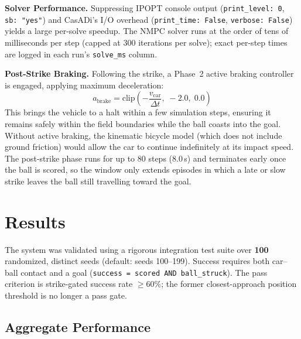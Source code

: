 \documentclass[10pt,twocolumn,letterpaper]{article}
\begin{document}
\textbf{Solver Performance.} Suppressing IPOPT console output
(\texttt{print\_level:\,0}, \texttt{sb:\,"yes"}) and CasADi's I/O
overhead (\texttt{print\_time:\,False}, \texttt{verbose:\,False})
yields a large per-solve speedup. The NMPC solver runs at the order of
tens of milliseconds per step (capped at 300 iterations per solve);
exact per-step times are logged in each run's \texttt{solve\_ms} column.

\textbf{Post-Strike Braking.} Following the strike, a Phase~2 active
braking controller is engaged, applying maximum deceleration:
\begin{equation}
  a_{\text{brake}} = \text{clip}\!\left(
    -\frac{v_{\text{car}}}{\Delta t},\; -2.0,\; 0.0\right)
  \label{eq:brake}
\end{equation}
This brings the vehicle to a halt within a few simulation steps,
ensuring it remains safely within the field boundaries while the ball
coasts into the goal. Without active braking, the kinematic bicycle
model (which does not include ground friction) would allow the car to
continue indefinitely at its impact speed. The post-strike phase runs
for up to 80 steps (8.0\,s) and terminates early once the ball is
scored, so the window only extends episodes in which a late or slow
strike leaves the ball still travelling toward the goal.

\section{Results}

The system was validated using a rigorous integration test suite over
\textbf{100} randomized, distinct seeds (default: seeds 100--199).
Success requires both car--ball contact and a goal
(\texttt{success = scored AND ball\_struck}). The pass criterion is
strike-gated success rate $\geq 60\%$; the former closest-approach
position threshold is no longer a pass gate.

\subsection{Aggregate Performance}
\end{document}
